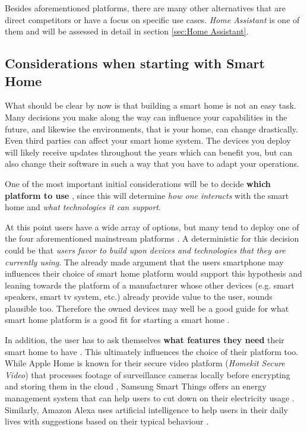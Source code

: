 Besides aforementioned platforms, there are many other alternatives that are direct competitors or have a focus on specific use cases. \textit{Home Assistant} is one of them and will be assessed in detail in section \ref{sec:Home Assistant}.



\subsection{Considerations when starting with Smart Home}
What should be clear by now is that building a smart home is not an easy task. Many decisions you make along the way can influence your capabilities in the future, and likewise the environments, that is your home, can change drastically. Even third parties can affect your smart home system. The devices you deploy will likely receive updates throughout the years which can benefit you, but can also change their software in such a way that you have to adapt your operations.

One of the most important initial considerations will be to decide \textbf{which platform to use} \cite{Tuohy2023SHP}, since this will determine \textit{how one interacts} with the smart home and \textit{what technologies it can support}.

At this point users have a wide array of options, but many tend to deploy one of the four aforementioned mainstream platforms \cite{Tuohy2023SHP}. A deterministic for this decision could be that \textit{users favor to build upon devices and technologies that they are currently using}. The already made argument that the users smartphone may influences their choice of smart home platform would support this hypothesis and leaning towards the platform of a manufacturer whose other devices (e.g. smart speakers, smart tv system, etc.) already provide value to the user, sounds plausible too. Therefore the owned devices may well be a good guide for what smart home platform is a good fit for starting a smart home \cite{Tuohy2023SHP}.

In addition, the user has to ask themselves \textbf{what features they need} their smart home to have \cite{Tuohy2023SHP}. This ultimately influences the choice of their platform too. While Apple Home is known for their secure video platform (\textit{Homekit Secure Video}) that processes footage of surveillance cameras locally before encrypting and storing them in the cloud \cite{Kastrenakes2019HKSC}, Samsung Smart Things offers an energy management system that can help users to cut down on their electricity usage \cite{Tuohy2023SHP}\cite{SamsungSmartThingsEnergy}. Similarly, Amazon Alexa uses artificial intelligence to help users in their daily lives with suggestions based on their typical behaviour \cite{Liao2018AH}.

